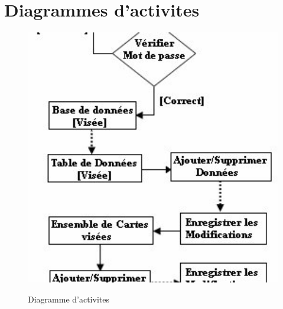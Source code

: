 \section{Diagrammes d'activites}
\lipsum[1]

\begin{figure}[t]
    \centering
    \includegraphics[width=1\textwidth]{diagrammeActivite}
    \label{image-diagrammeActivite}
    \caption{Diagramme d'activites}
    \end{figure}
